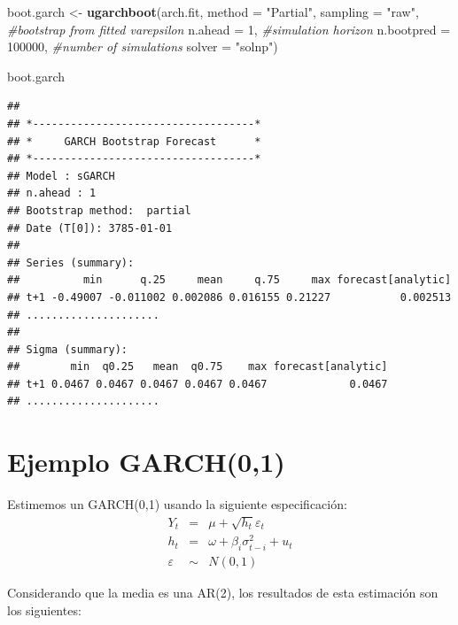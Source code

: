 \documentclass[
]{book}
\newenvironment{Shaded}{\begin{snugshade}}{\end{snugshade}}
\newcommand{\AttributeTok}[1]{\textcolor[rgb]{0.13,0.29,0.53}{#1}}
\newcommand{\CommentTok}[1]{\textcolor[rgb]{0.56,0.35,0.01}{\textit{#1}}}
\newcommand{\DecValTok}[1]{\textcolor[rgb]{0.00,0.00,0.81}{#1}}
\newcommand{\FunctionTok}[1]{\textcolor[rgb]{0.13,0.29,0.53}{\textbf{#1}}}
\newcommand{\NormalTok}[1]{#1}
\newcommand{\OtherTok}[1]{\textcolor[rgb]{0.56,0.35,0.01}{#1}}
\newcommand{\StringTok}[1]{\textcolor[rgb]{0.31,0.60,0.02}{#1}}
\begin{document}
\begin{Shaded}
\begin{Highlighting}[]
\NormalTok{boot.garch }\OtherTok{\textless{}{-}} \FunctionTok{ugarchboot}\NormalTok{(arch.fit,}
                         \AttributeTok{method =} \StringTok{"Partial"}\NormalTok{,}
                         \AttributeTok{sampling =} \StringTok{"raw"}\NormalTok{,  }\CommentTok{\#bootstrap from fitted varepsilon}
                         \AttributeTok{n.ahead =} \DecValTok{1}\NormalTok{,          }\CommentTok{\#simulation horizon}
                         \AttributeTok{n.bootpred =} \DecValTok{100000}\NormalTok{, }\CommentTok{\#number of simulations }
                         \AttributeTok{solver =} \StringTok{"solnp"}\NormalTok{)}

\NormalTok{boot.garch}
\end{Highlighting}
\end{Shaded}

\begin{verbatim}
## 
## *-----------------------------------*
## *     GARCH Bootstrap Forecast      *
## *-----------------------------------*
## Model : sGARCH
## n.ahead : 1
## Bootstrap method:  partial
## Date (T[0]): 3785-01-01
## 
## Series (summary):
##          min      q.25     mean     q.75     max forecast[analytic]
## t+1 -0.49007 -0.011002 0.002086 0.016155 0.21227           0.002513
## .....................
## 
## Sigma (summary):
##        min  q0.25   mean  q0.75    max forecast[analytic]
## t+1 0.0467 0.0467 0.0467 0.0467 0.0467             0.0467
## .....................
\end{verbatim}

\hypertarget{ejemplo-garch01}{%
\section{Ejemplo GARCH(0,1)}\label{ejemplo-garch01}}

Estimemos un GARCH(0,1) usando la siguiente especificación:
\begin{eqnarray*}
Y_t & = & \mu+\sqrt{h_t}\varepsilon_t \\
    h_t & = & \omega+\beta_i \sigma^2_{t-i}+u_t \\
    \varepsilon & \sim & N(0,1) 
\end{eqnarray*}

Considerando que la media es una AR(2), los resultados de esta estimación son los siguientes:
\end{document}
